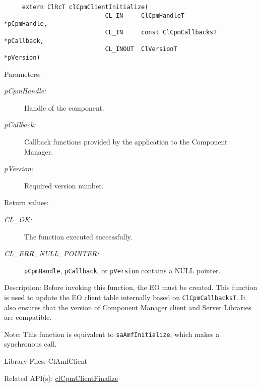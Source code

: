 {\begin{Desc}
\footnotesize\begin{verbatim}     extern ClRcT clCpmClientInitialize(
                			CL_IN     ClCpmHandleT            *pCpmHandle,
                			CL_IN     const ClCpmCallbacksT   *pCallback,
                			CL_INOUT  ClVersionT              *pVersion)
\end{verbatim}
\normalsize
\end{Desc}
\begin{Desc}
\item[Parameters:]
\begin{description}
\item[{\em p\-Cpm\-Handle:}]Handle of the component. 
\item[{\em p\-Callback:}]Callback functions provided by the application to the Component Manager. 
\item[{\em p\-Version:}]Required version number.\end{description}
\end{Desc}
\begin{Desc}
\item[Return values:]
\begin{description}
\item[{\em CL\_\-OK:}]The function executed successfully. 
\item[{\em CL\_\-ERR\_\-NULL\_\-POINTER:}]{\tt{pCpmHandle}}, {\tt{pCallback}}, or {\tt{pVersion}} contains a NULL pointer.\end{description}
\end{Desc}
\begin{Desc}
\item[Description:]Before invoking this function, the EO must be created. This function is used to update the EO client table internally based on 
{\tt{Cl\-Cpm\-Callbacks\-T}}. It also ensures that the version of Component Manager client and Server Libraries are
compatible.
\end{Desc}
\begin{Desc}
\item[Note:]This function is equivalent to {\tt{sa\-Amf\-Initialize}}, which makes a synchronous call.\end{Desc}
\begin{Desc}
\item[Library Files:]Cl\-Amf\-Client\end{Desc}
\begin{Desc}
\item[Related API(s):]\hyperlink{group__group14}{cl\-Cpm\-Client\-Finalize} \end{Desc}

}
